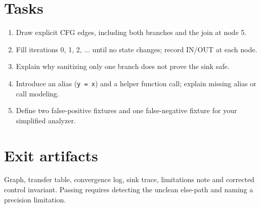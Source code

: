 \documentclass[10pt,letterpaper]{article}
\begin{document}
\section{Tasks}
\begin{enumerate}
\item Draw explicit CFG edges, including both branches and the join at node 5.
\item Fill iterations 0, 1, 2, ... until no state changes; record IN/OUT at each node.
\item Explain why sanitizing only one branch does not prove the sink safe.
\item Introduce an alias (\texttt{y = x}) and a helper function call; explain missing alias or call modeling.
\item Define two false-positive fixtures and one false-negative fixture for your simplified analyzer.
\end{enumerate}
\section{Exit artifacts}
Graph, transfer table, convergence log, sink trace, limitations note and corrected control invariant. Passing requires detecting the unclean else-path and naming a precision limitation.
\end{document}
